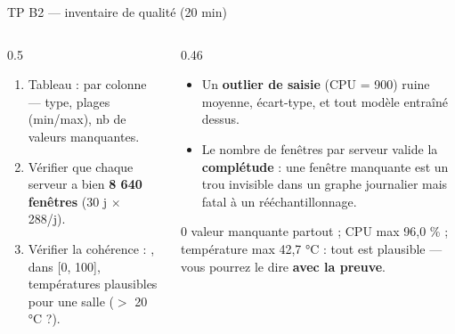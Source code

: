 \begin{frame}{TP B2 --- inventaire de qualité (20 min)}
\begin{columns}[t]
\begin{column}{0.5\textwidth}
\begin{abox}[À produire]
\begin{enumerate}
\item Tableau : par colonne --- type, plages (min/max), nb de valeurs manquantes.
\item Vérifier que chaque serveur a bien \textbf{8 640 fenêtres} (30 j $\times$ 288/j).
\item Vérifier la cohérence : ,
 dans [0, 100], températures plausibles pour une salle
($>$ 20 °C ?).
\end{enumerate}
\end{abox}
\end{column}
\begin{column}{0.46\textwidth}
\begin{kbox}
\begin{itemize}
\item Un \textbf{outlier de saisie} (CPU = 900) ruine moyenne, écart-type,
et tout modèle entraîné dessus.
\item Le nombre de fenêtres par serveur valide la \textbf{complétude} :
une fenêtre manquante est un trou invisible dans un graphe journalier mais
fatal à un rééchantillonnage.
\end{itemize}
\end{kbox}
\begin{ebox}
0 valeur manquante partout ; CPU max 96,0 \% ;
température max 42,7 °C : tout est plausible ---
vous pourrez le dire \textbf{avec la preuve}.
\end{ebox}
\end{column}
\end{columns}
\end{frame}

